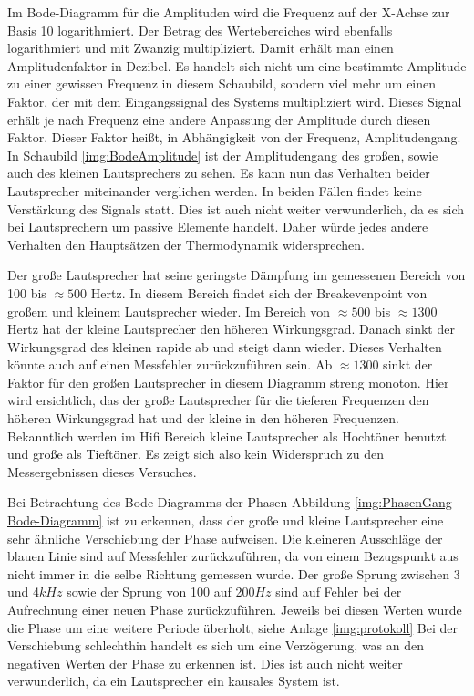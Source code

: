 Im Bode-Diagramm für die Amplituden wird die Frequenz auf der X-Achse zur Basis 10 logarithmiert. Der Betrag des Wertebereiches wird ebenfalls logarithmiert und mit Zwanzig multipliziert. Damit erhält man einen Amplitudenfaktor in Dezibel. Es handelt sich nicht um eine bestimmte Amplitude zu einer gewissen Frequenz in diesem Schaubild, sondern viel mehr um einen Faktor, der mit dem Eingangssignal des Systems multipliziert wird. Dieses Signal erhält je nach Frequenz eine andere Anpassung der Amplitude durch diesen Faktor. Dieser Faktor heißt, in Abhängigkeit von der Frequenz, Amplitudengang.
In Schaubild \ref{img:BodeAmplitude} ist der Amplitudengang des großen, sowie auch des kleinen Lautsprechers zu sehen.
Es kann nun das Verhalten beider Lautsprecher miteinander verglichen werden. In beiden Fällen findet keine Verstärkung des Signals statt. Dies ist auch nicht weiter verwunderlich, da es sich bei Lautsprechern um passive Elemente handelt. Daher würde jedes andere Verhalten den Hauptsätzen der Thermodynamik widersprechen.

Der große Lautsprecher hat seine geringste Dämpfung im gemessenen Bereich von 100 bis $\approx500$ Hertz. In diesem Bereich findet sich der Breakevenpoint von großem und kleinem Lautsprecher wieder. Im Bereich von $\approx500$ bis $\approx1300$ Hertz hat der kleine Lautsprecher den höheren Wirkungsgrad. Danach sinkt der Wirkungsgrad des kleinen rapide ab und steigt dann wieder. Dieses Verhalten könnte auch auf einen Messfehler zurückzuführen sein. Ab $\approx1300$ sinkt der Faktor für den großen Lautsprecher in diesem Diagramm streng monoton. Hier wird ersichtlich, das der große Lautsprecher für die tieferen Frequenzen den höheren Wirkungsgrad hat und der kleine in den höheren Frequenzen. Bekanntlich werden im Hifi Bereich kleine Lautsprecher als Hochtöner benutzt und große  als Tieftöner. Es zeigt sich also kein Widerspruch zu den Messergebnissen dieses Versuches.

Bei Betrachtung des Bode-Diagramms der Phasen Abbildung \ref{img:PhasenGang Bode-Diagramm} ist zu erkennen, dass der große und kleine Lautsprecher eine sehr ähnliche Verschiebung der Phase aufweisen.
Die kleineren Ausschläge der blauen Linie sind auf Messfehler zurückzuführen, da von einem Bezugspunkt aus nicht immer in die selbe Richtung gemessen wurde. Der große Sprung zwischen 3 und 4$kHz$ sowie der Sprung von 100 auf 200$Hz$ sind auf Fehler bei der Aufrechnung einer neuen Phase zurückzuführen. Jeweils bei diesen Werten wurde die Phase um eine weitere Periode überholt, siehe Anlage \ref{img:protokoll} Bei der Verschiebung schlechthin handelt es sich um eine Verzögerung, was an den negativen Werten der Phase zu erkennen ist. Dies ist auch nicht weiter verwunderlich, da ein Lautsprecher ein kausales System ist.



